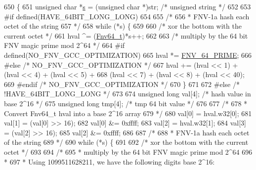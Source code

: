 \begin{DoxyCode}
650 \{
651     \textcolor{keywordtype}{unsigned} \textcolor{keywordtype}{char} *\hyperlink{generate__test__data__lte__sinr_8m_ad83eeb3a142285d1243a08c6b7026df8}{s} = (\textcolor{keywordtype}{unsigned} \textcolor{keywordtype}{char} *)str;   \textcolor{comment}{/* unsigned string */}
652 
653 \textcolor{preprocessor}{#if defined(HAVE\_64BIT\_LONG\_LONG)}
654 
655     \textcolor{comment}{/*}
656 \textcolor{comment}{     * FNV-1a hash each octet of the string}
657 \textcolor{comment}{     */}
658     \textcolor{keywordflow}{while} (*s) \{
659 
660         \textcolor{comment}{/* xor the bottom with the current octet */}
661         hval ^= (\hyperlink{group__hash__fnv_ga4b6673bffbef8355685a9e0129b86e16}{Fnv64\_t})*s++;
662 
663         \textcolor{comment}{/* multiply by the 64 bit FNV magic prime mod 2^64 */}
664 \textcolor{preprocessor}{#if defined(NO\_FNV\_GCC\_OPTIMIZATION)}
665         hval *= \hyperlink{group__hash__fnv_ga843a032e93d6d54b28933d827eb4c966}{FNV\_64\_PRIME};
666 \textcolor{preprocessor}{#else }\textcolor{comment}{/* NO\_FNV\_GCC\_OPTIMIZATION */}\textcolor{preprocessor}{}
667         hval += (hval << 1) + (hval << 4) + (hval << 5) +
668                 (hval << 7) + (hval << 8) + (hval << 40);
669 \textcolor{preprocessor}{#endif }\textcolor{comment}{/* NO\_FNV\_GCC\_OPTIMIZATION */}\textcolor{preprocessor}{}
670     \}
671 
672 \textcolor{preprocessor}{#else }\textcolor{comment}{/* !HAVE\_64BIT\_LONG\_LONG */}\textcolor{preprocessor}{}
673 
674     \textcolor{keywordtype}{unsigned} \textcolor{keywordtype}{long} val[4];       \textcolor{comment}{/* hash value in base 2^16 */}
675     \textcolor{keywordtype}{unsigned} \textcolor{keywordtype}{long} tmp[4];       \textcolor{comment}{/* tmp 64 bit value */}
676 
677     \textcolor{comment}{/*}
678 \textcolor{comment}{     * Convert Fnv64\_t hval into a base 2^16 array}
679 \textcolor{comment}{     */}
680     val[0] = hval.w32[0];
681     val[1] = (val[0] >> 16);
682     val[0] &= 0xffff;
683     val[2] = hval.w32[1];
684     val[3] = (val[2] >> 16);
685     val[2] &= 0xffff;
686 
687     \textcolor{comment}{/*}
688 \textcolor{comment}{     * FNV-1a hash each octet of the string}
689 \textcolor{comment}{     */}
690     \textcolor{keywordflow}{while} (*s) \{
691 
692         \textcolor{comment}{/* xor the bottom with the current octet */}
693 
694         \textcolor{comment}{/*}
695 \textcolor{comment}{         * multiply by the 64 bit FNV magic prime mod 2^64}
696 \textcolor{comment}{         *}
697 \textcolor{comment}{         * Using 1099511628211, we have the following digits base 2^16:}

\end{DoxyCode}
